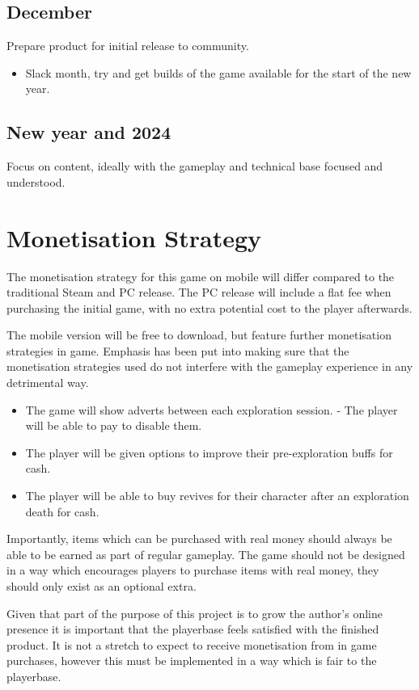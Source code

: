 \documentclass[a4paper]{scrreprt}
\begin{document}
\subsection{December}
Prepare product for initial release to community.

    \begin{itemize}
        \item Slack month, try and get builds of the game available for the start of the new year.
    \end{itemize}

\subsection{New year and 2024}
Focus on content, ideally with the gameplay and technical base focused and understood.

\section{Monetisation Strategy}
The monetisation strategy for this game on mobile will differ compared to the traditional Steam and PC release.
The PC release will include a flat fee when purchasing the initial game, with no extra potential cost to the player afterwards.

The mobile version will be free to download, but feature further monetisation strategies in game.
Emphasis has been put into making sure that the monetisation strategies used do not interfere with the gameplay experience in any detrimental way.

    \begin{itemize}
        \item The game will show adverts between each exploration session. - The player will be able to pay to disable them.
        \item The player will be given options to improve their pre-exploration buffs for cash.
        \item The player will be able to buy revives for their character after an exploration death for cash.
    \end{itemize}

Importantly, items which can be purchased with real money should always be able to be earned as part of regular gameplay.
The game should not be designed in a way which encourages players to purchase items with real money, they should only exist as an optional extra.

Given that part of the purpose of this project is to grow the author's online presence it is important that the playerbase feels satisfied with the finished product.
It is not a stretch to expect to receive monetisation from in game purchases, however this must be implemented in a way which is fair to the playerbase.
\end{document}
